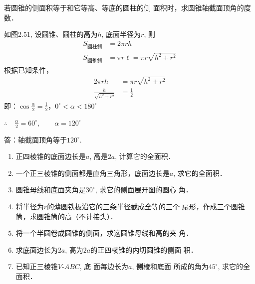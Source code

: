 \begin{example}
    若圆锥的侧面积等于和它等高、等底的圆柱的侧
面积时，求圆锥轴截面顶角的度数．
\end{example}

\begin{figure}[htp]
    \centering
{}
    \caption{}
\end{figure}

\begin{solution}
    如图2.51, 设圆锥、圆柱的高为$h$, 底面半径为$r$, 则
\[\begin{split}
    S_{\text{圆柱侧}}&=2\pi rh\\
S_{\text{圆锥侧}} &=\pi r\ell=\pi r\sqrt{h^2+r^2}
\end{split}\]
根据已知条件，
\[\begin{split}
    2\pi rh&=\pi r\sqrt{h^2+r^2}\\
\frac{h}{\sqrt{h^2+r^2}}&=\frac{1}{2}
\end{split}\]
即：$\cos\frac{\alpha}{2}=\frac{1}{2}$，$0^{\circ}<\alpha<180^{\circ}$

$\therefore\quad \frac{\alpha}{2}=60^{\circ},\qquad \alpha=120^{\circ}$

答：轴截面顶角等于$120^{\circ}$.
\end{solution}

\begin{ex}
\begin{enumerate}
    \item 正四棱锥的底面边长是$a$, 高是$2a$, 计算它的全面积．
    \item 一个正三棱锥的侧面都是直角三角形，底面边长是$a$, 
    求它的全面积．
    \item 圆锥母线和底面夹角是$30^{\circ}$, 求它的侧面展开图的圆心
    角．
    \item 将半径为$r$的薄圆铁板沿它的三条半径截成全等的三个
    扇形，作成三个圆锥筒，求圆锥筒的高（不计接头）．
    \item 
    将一个半圆卷成圆锥的侧面，求这圆锥母线和高的夹
    角．
    \item 求底面边长为$2a$, 高为$2a$的正四棱锥的内切圆锥的侧面
    积．
    \item 已知正三棱锥$V$-$ABC$, 底
    面每边长为$a$, 侧棱和底面
    所成的角为$45^{\circ}$, 求它的全
    面积．
\end{enumerate}
\end{ex}

